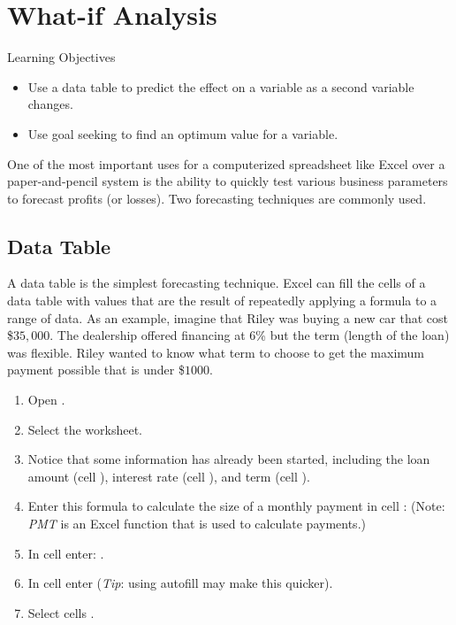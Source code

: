 \section{What-if Analysis}

\begin{center}
	\begin{objbox}{Learning Objectives}
		\begin{itemize}
			\setlength{\itemsep}{0pt}
			\setlength{\parskip}{0pt}
			\setlength{\parsep}{0pt}
			
			\item Use a data table to predict the effect on a variable as a second variable changes.
			\item Use goal seeking to find an optimum value for a variable.
			
		\end{itemize}
	\end{objbox}
\end{center}

One of the most important uses for a computerized spreadsheet like Excel over a paper-and-pencil system is the ability to quickly test various business parameters to forecast profits (or losses). Two forecasting techniques are commonly used. 

\subsection{Data Table}

A data table is the simplest forecasting technique. Excel can fill the cells of a data table with values that are the result of repeatedly applying a formula to a range of data. As an example, imagine that Riley was buying a new car that cost \$$ 35,000 $. The dealership offered financing at $ 6 $\% but the term (length of the loan) was flexible. Riley wanted to know what term to choose to get the maximum payment possible that is under \$$ 1000 $.

\begin{enumerate}
	\item Open .
	\item Select the  worksheet.
	\item Notice that some information has already been started, including the loan amount (cell ), interest rate (cell ), and term (cell ).
	\item Enter this formula to calculate the size of a monthly payment in cell :  (Note: \textit{PMT} is an Excel function that is used to calculate payments.)
	\item In cell  enter: .
	\item In cell  enter  (\textit{Tip}: using autofill may make this quicker).
	\item Select cells .
\end{enumerate}

